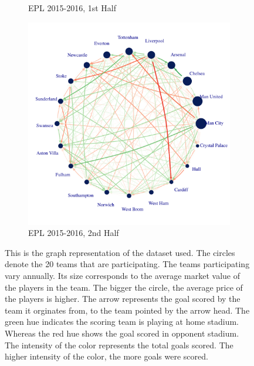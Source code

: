 \documentclass[12pt,a4paper,twoside,openany]{book}
\makeatletter
\def\maxwidth{ %
  \ifdim\Gin@nat@width>\linewidth
    \linewidth
  \else
    \Gin@nat@width
  \fi
}
\newenvironment{knitrout}{}{} %
\makeatother
\begin{document}
\begin{figure}[H]
\begin{subfigure}{0.40\textwidth}
\begin{knitrout}
{}



\end{knitrout}
\caption{EPL 2015-2016, 1st Half}
\end{subfigure}\hspace*{\fill}
\begin{subfigure}{0.40\textwidth}
\begin{knitrout}
\color{fgcolor}

{\centering \includegraphics[width=\maxwidth]{figure/unnamed-chunk-8-1} 

}



\end{knitrout}
\caption{EPL 2015-2016, 2nd Half}
\end{subfigure}
\hspace*{\fill}
 
\caption [Graph Representation of a Football League]{This is the graph representation of the dataset used. The circles denote the 20 teams that are participating. The teams participating vary annually. Its size corresponds to the average market value of the players in the team. The bigger the circle, the average price of the players is higher. The arrow represents the goal scored by the team it orginates from, to the team pointed by the arrow head. The green hue indicates the scoring team is playing at home stadium. Whereas the red hue shows the goal scored in opponent stadium. The intensity of the color represents the total goals scored. The higher intensity of the color, the more goals were scored.} \label{fig:1}
\end{figure}
\end{document}

